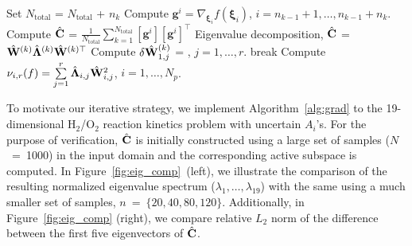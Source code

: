 \begin{breakablealgorithm}
\begin{algorithmic}[1]
		\State Set $N_\text{total}$ = $N_\text{total}$ + $n_k$ 
		\State Compute $\bm{g}^i = \nabla_{\bm{\xi}_i}f(\bm{\xi}_i)$, 
             	$i=n_{k-1}+1, \ldots, n_{k-1}+n_k$.  
		\State Compute $\hat{\mathbf{{C}}}$ = 
        	$\frac{1}{N_\text{total}}\sum\limits_{k=1}^{N_\text{total}}[\bm{g}^i][\bm{g}^i]^\top$
		\State Eigenvalue decomposition, $\hat{\mathbf{{C}}}$ = $\hat{\mathbf{{W}}}^{(k)}\hat{\mathbf{{\Lambda}}}^{(k)}
		 \hat{\mathbf{{W}}}^{(k)\top}$
		\State Compute $\delta \hat{\mathbf{{W}}}_{1,j}^{(k)}$ = 
                       , 
                       $j = 1,\ldots,r$.
			\State break
		\EndIf
	\EndLoop
	\State Compute $\nu_{i,r}(f) = \sum\limits_{j=1}^{r} \hat{\mathbf{{\Lambda}}}_{i,j}\hat{\mathbf{{W}}}_{i,j}^2$,
	$i=1,\ldots,N_p$.
	
    \EndProcedure
  \end{algorithmic}
  \label{alg:grad}
\end{breakablealgorithm}
\bigskip

To motivate our iterative strategy, we implement
Algorithm~\ref{alg:grad} to the 19-dimensional H$_2$/O$_2$ reaction kinetics
problem with uncertain $A_i$'s. For the purpose of verification,
$\hat{\mathbf{{C}}}$ is initially constructed using a large set of samples
($N$~=~1000) in the input domain and the corresponding active subspace is
computed. In Figure~\ref{fig:eig_comp}~(left), we illustrate the comparison of
the resulting normalized eigenvalue spectrum ($\lambda_1, \ldots, 
\lambda_{19}$) with the same using a much 
smaller set of samples, $n$~=~$\{20,40,80,120\}$.
Additionally, in Figure~\ref{fig:eig_comp} (right), we compare relative $L_2$
norm of the difference between the first five eigenvectors of $\hat{\mathbf{{C}}}$.


